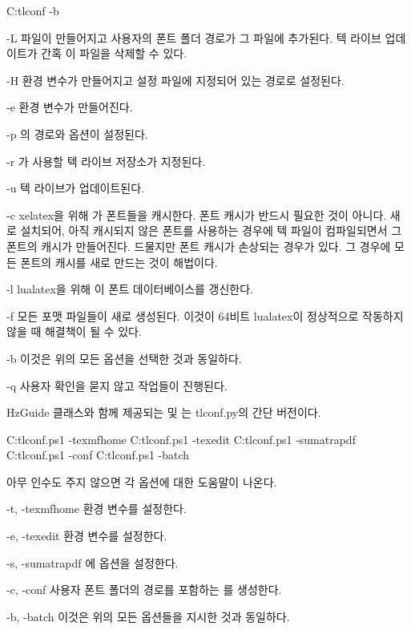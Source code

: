 \begin{code}
C:\>tlconf -b
\end{code}

\begin{macros}
\item[-L]  파일이 만들어지고 사용자의 폰트 폴더 경로가 그 파일에 추가된다.
텍 라이브 업데이트가 간혹 이 파일을 삭제할 수 있다.
\item[-H]  환경 변수가 만들어지고 설정 파일에 지정되어 있는 경로로 설정된다.
\item[-e]  환경 변수가 만들어진다.
\item[-p] 의 경로와  옵션이 설정된다. 
\item[-r] 가 사용할 텍 라이브 저장소가 지정된다.
\item[-u] 텍 라이브가 업데이트된다.
\item[-c] xelatex을 위해 가 폰트들을 캐시한다.
폰트 캐시가 반드시 필요한 것이 아니다.
새로 설치되어, 아직 캐시되지 않은 폰트를 사용하는 경우에 텍 파일이 컴파일되면서 그 폰트의 캐시가 만들어진다. 
드물지만 폰트 캐시가 손상되는 경우가 있다. 
그 경우에 모든 폰트의 캐시를 새로 만드는 것이 해법이다.
\item[-l] lualatex을 위해 이 폰트 데이터베이스를 갱신한다.
\item[-f] 모든 포맷 파일들이 새로 생성된다. 이것이 64비트 lualatex이 정상적으로 작동하지 않을 때 해결책이 될 수 있다.
\item[-b] 이것은 위의 모든 옵션을 선택한 것과 동일하다.
\item[-q] 사용자 확인을 묻지 않고 작업들이 진행된다.
\end{macros}

HzGuide 클래스와 함께 제공되는  및 는 tlconf.py의 간단 버전이다.

\begin{codewrite}
C:\>tlconf.ps1 -texmfhome 
C:\>tlconf.ps1 -texedit
C:\>tlconf.ps1 -sumatrapdf
C:\>tlconf.ps1 -conf
C:\>tlconf.ps1 -batch
\end{codewrite}
\coderead

아무 인수도 주지 않으면 각 옵션에 대한 도움말이 나온다.

\begin{macros}
\item[-t, -texmfhome]  환경 변수를 설정한다.
\item[-e, -texedit]  환경 변수를 설정한다.
\item[-s, -sumatrapdf] 에  옵션을 설정한다.
\item[-c, -conf] 사용자 폰트 폴더의 경로를 포함하는 를 생성한다.
\item[-b, -batch] 이것은 위의 모든 옵션들을 지시한 것과 동일하다.
\end{macros}

